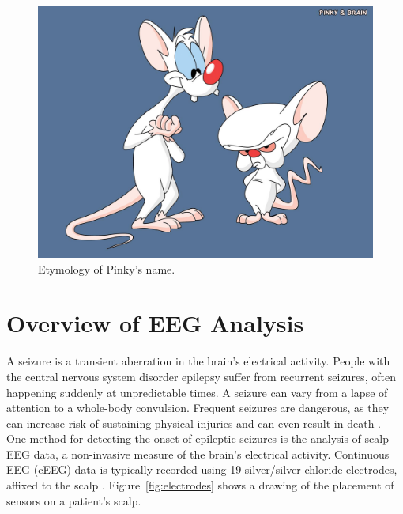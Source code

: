\begin{figure}[h]
\begin{center}
\includegraphics[scale=0.5]{./img/pinky-and-the-brain.png}
\caption{Etymology of Pinky's name.}
\label{fig:pinky-and-the-brain}
\end{center}
\end{figure}

\section{Overview of EEG Analysis}\label{intro-ch:eeg-overview}

A seizure is a transient aberration in the brain's electrical activity. People
with the central nervous system disorder epilepsy suffer from recurrent
seizures, often happening suddenly at unpredictable times. A seizure can vary
from a lapse of attention to a whole-body convulsion. Frequent seizures are
dangerous, as they can increase risk of sustaining physical injuries and can
even result in death \cite{eeg-ml}. \\

One method for detecting the onset of epileptic seizures is the analysis of
scalp EEG data, a non-invasive measure of the brain's electrical activity.
Continuous EEG (cEEG) data is typically recorded using 19 silver/silver
chloride electrodes, affixed to the scalp \cite{ceeg-1}.
Figure~\ref{fig:electrodes} shows a drawing of the placement of sensors on a
patient's scalp. \\

